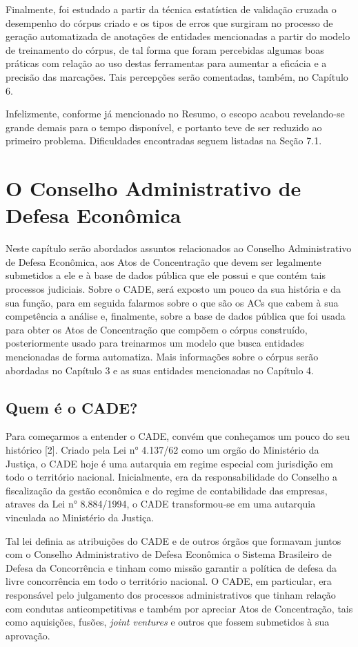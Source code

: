 \documentclass[11pt]{report}
\begin{document}
Finalmente, foi estudado a partir da técnica estatística de validação cruzada o desempenho do córpus criado e os tipos de erros que surgiram no processo de geração automatizada
de anotações de entidades mencionadas a partir do modelo de treinamento do córpus, de tal forma que foram percebidas algumas boas práticas com relação ao uso destas ferramentas
para aumentar a eficácia e a precisão das marcações. Tais percepções serão comentadas, também, no Capítulo 6.

Infelizmente, conforme já mencionado no Resumo, o escopo acabou revelando-se grande demais para o tempo disponível, e portanto teve de ser reduzido
ao primeiro problema. Dificuldades encontradas seguem listadas na Seção 7.1.

\pagebreak
\chapter{O Conselho Administrativo de Defesa Econômica}

\indent\indent Neste capítulo serão abordados assuntos relacionados ao Conselho Administrativo de Defesa Econômica, aos Atos de Concentração que devem ser legalmente submetidos a ele e à base de dados pública que ele possui e
que contém tais processos judiciais. Sobre o CADE, será exposto um pouco da sua história e da sua função, para em seguida falarmos sobre o que são os ACs que cabem à sua competência
a análise e, finalmente, sobre a base de dados pública que foi usada para obter os Atos de Concentração que compõem o córpus construído, posteriormente usado para treinarmos um modelo
que busca entidades mencionadas de forma automatiza. Mais informações sobre o córpus serão abordadas no Capítulo 3 e as suas entidades mencionadas no Capítulo 4.

\section{Quem é o CADE?}

\indent\indent Para começarmos a entender o CADE, convém que conheçamos um pouco do seu histórico [2]. Criado pela Lei n° 4.137/62 como um orgão do Ministério da Justiça, o CADE hoje é uma autarquia em regime especial com jurisdição em todo o território nacional. Inicialmente,
era da responsabilidade do Conselho a fiscalização da gestão econômica e do regime de contabilidade das empresas, atraves da Lei n° 8.884/1994, o CADE transformou-se em uma
autarquia vinculada ao Ministério da Justiça.

Tal lei definia as atribuições do CADE e de outros órgãos que formavam juntos com o Conselho Administrativo de Defesa Econômica o Sistema Brasileiro de Defesa da Concorrência e tinham
como missão garantir a política de defesa da livre concorrência em todo o território nacional. O CADE, em particular, era responsável pelo julgamento dos processos administrativos
que tinham relação com condutas anticompetitivas e também por apreciar Atos de Concentração, tais como aquisições, fusões, \textit{joint ventures} e outros que fossem submetidos
à sua aprovação.
\end{document}
